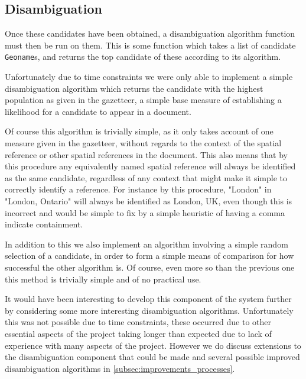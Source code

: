 \documentclass[12pt, a4paper]{report}
\begin{document}

\subsection{Disambiguation}

Once these candidates have been obtained, a disambiguation algorithm function must then be run on them. This is some function which takes a list of candidate \verb#Geoname#s, and returns the top candidate of these according to its algorithm.

Unfortunately due to time constraints we were only able to implement a simple disambiguation algorithm which returns the candidate with the highest population as given in the gazetteer, a simple base measure of establishing a likelihood for a candidate to appear in a document.

Of course this algorithm is trivially simple, as it only takes account of one measure given in the gazetteer, without regards to the context of the spatial reference or other spatial references in the document. This also means that by this procedure any equivalently named spatial reference will always be identified as the same candidate, regardless of any context that might make it simple to correctly identify a reference. For instance by this procedure, "London" in "London, Ontario" will always be identified as London, UK, even though this is incorrect and would be simple to fix by a simple heuristic of having a comma indicate containment.

In addition to this we also implement an algorithm involving a simple random selection of a candidate, in order to form a simple means of comparison for how successful the other algorithm is. Of course, even more so than the previous one this method is trivially simple and of no practical use.

It would have been interesting to develop this component of the system further by considering some more interesting disambiguation algorithms. Unfortunately this was not possible due to time constraints, these occurred due to other essential aspects of the project taking longer than expected due to lack of experience with many aspects of the project. However we do discuss extensions to the disambiguation component that could be made and several possible improved disambiguation algorithms in \ref{subsec:improvements_processes}.
\end{document}
